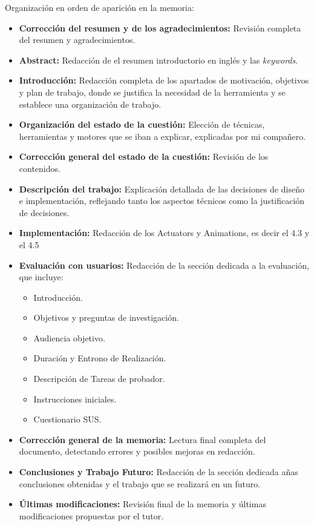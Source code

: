 Organización en orden de aparición en la memoria:
\begin{itemize}
  \item \textbf{Corrección del resumen y de los agradecimientos:} Revisión completa del resumen y agradecimientos.
  \item \textbf{Abstract:} Redacción de el resumen introductorio en inglés y las \textit{keywords}.
  \item \textbf{Introducción:} Redacción completa de los apartados de motivación, objetivos y plan de trabajo, donde se justifica la necesidad de la herramienta y se establece una organización de trabajo.
  \item \textbf{Organización del estado de la cuestión:} Elección de técnicas, herramientas y motores que se iban a explicar, explicadas por mi compañero.
  \item \textbf{Corrección general del estado de la cuestión:} Revisión de los contenidos.
  \item \textbf{Descripción del trabajo:} Explicación detallada de las decisiones de diseño e implementación, reflejando tanto los aspectos técnicos como la justificación de decisiones.
  \item \textbf{Implementación:} Redacción de los Actuators y Animations, es decir el 4.3 y el 4.5
  \item \textbf{Evaluación con usuarios:} Redacción de la sección dedicada a la evaluación, que incluye:
  \begin{itemize}
    \item Introducción.
    \item Objetivos y preguntas de investigación.
    \item Audiencia objetivo.
    \item Duración y Entrono de Realización.
    \item Descripción de Tareas de probador.
    \item Instrucciones iniciales.
    \item Cuestionario SUS.
  \end{itemize}

  \item \textbf{Corrección general de la memoria:} Lectura final completa del documento, detectando errores  y posibles mejoras en redacción.
  \item \textbf{Conclusiones y Trabajo Futuro:} Redacción de la sección dedicada añas conclusiones obtenidas y el trabajo que se realizará en un futuro.
  \item \textbf{ Últimas modificaciones:} Revisión final de la memoria y últimas modificaciones propuestas por el tutor.
\end{itemize}

